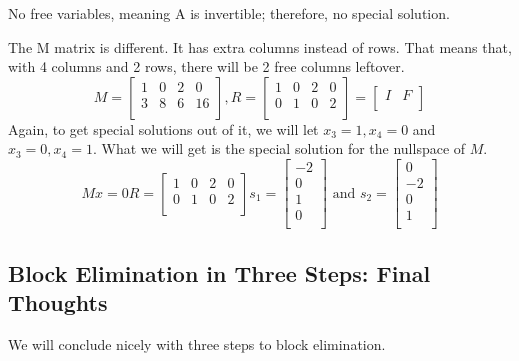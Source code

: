 No free variables, meaning A is invertible; therefore, no special solution. 

The M matrix is different. It has extra columns instead of rows. That means that, with 4 columns and 2 rows, there will be 2 free columns leftover. 
\[
    M = 
    \begin{bmatrix}
        1 & 0 & 2 & 0  \\
        3 & 8 & 6 & 16  \\
    \end{bmatrix}, 
    R = 
    \begin{bmatrix}
        1 & 0 & 2 & 0  \\
        0 & 1 & 0 & 2  \\
    \end{bmatrix}
    = 
    \begin{bmatrix}
        I & F  \\
    \end{bmatrix}
\]
Again, to get special solutions out of it, we will let \(x_3 = 1, x_4 = 0\) and \(x_3 = 0, x_4 = 1\). What we will get is the special solution for the nullspace of \(M\). 
\[
    Mx = 0
    R = 
    \begin{bmatrix}
        1 & 0 & 2 & 0  \\
        0 & 1 & 0 & 2  \\
    \end{bmatrix}
    s_1 = 
    \begin{bmatrix}
        -2 \\
        0 \\
        1\\
        0\\
    \end{bmatrix}
    \text{ and }
    s_2 = 
    \begin{bmatrix}
         0 \\
         -2 \\
         0 \\
         1 \\
    \end{bmatrix}
\]  

\subsection{Block Elimination in Three Steps: Final Thoughts}

We will conclude nicely with three steps to block elimination.

